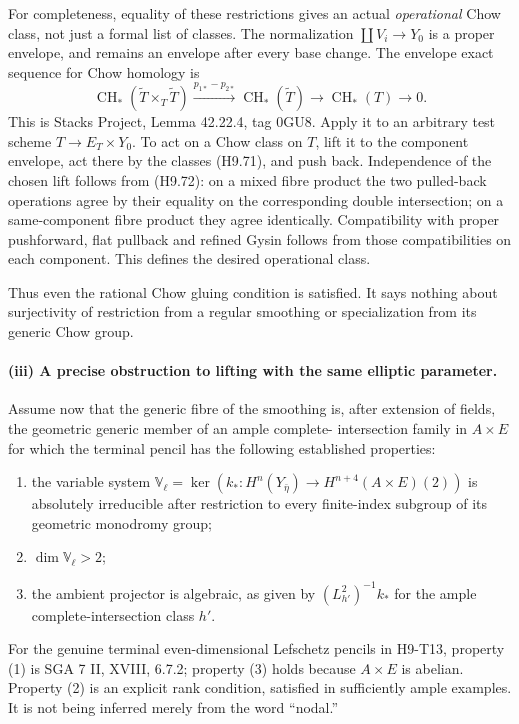 \documentclass[11pt,a4paper]{article}
\begin{document}
For completeness, equality of these restrictions gives an actual
\emph{operational} Chow class, not just a formal list of classes.
The normalization $\coprod V_i\to Y_0$ is a proper envelope, and
remains an envelope after every base change. The envelope exact
sequence for Chow homology is
\[
 \operatorname{CH}_*(\widetilde T\times_T\widetilde T)
 \xrightarrow{p_{1*}-p_{2*}}\operatorname{CH}_*(\widetilde T)
 \longrightarrow\operatorname{CH}_*(T)\longrightarrow0.
                                                               \tag{H9.72}
\]
This is Stacks Project, Lemma 42.22.4, tag 0GU8. Apply it to an
arbitrary test scheme $T\to E_T\times Y_0$. To act on a Chow
class on $T$, lift it to the component envelope, act there by the
classes (H9.71), and push back. Independence of the chosen lift
follows from (H9.72): on a mixed fibre product the two pulled-back
operations agree by their equality on the corresponding double
intersection; on a same-component fibre product they agree
identically. Compatibility with proper pushforward, flat pullback
and refined Gysin follows from those compatibilities on each
component. This defines the desired operational class.

Thus even the rational Chow gluing condition is satisfied. It says
nothing about surjectivity of restriction from a regular smoothing
or specialization from its generic Chow group.

\paragraph{(iii) A precise obstruction to lifting with the same elliptic parameter.}
Assume now that the generic fibre of the smoothing is, after extension
of fields, the geometric generic member of an ample complete-
intersection family in $A\times E$ for which the terminal pencil
has the following established properties:
\begin{enumerate}
\item the variable system
$\mathbb V_\ell=\ker(k_*:H^n(Y_{\bar\eta})
       \to H^{n+4}(A\times E)(2))$
is absolutely irreducible after restriction to every finite-index
subgroup of its geometric monodromy group;
\item $\dim\mathbb V_\ell>2$;
\item the ambient projector is algebraic, as given by
$(L_{h'}^2)^{-1}k_*$ for the ample complete-intersection class $h'$.
\end{enumerate}
For the genuine terminal even-dimensional Lefschetz pencils in
H9-T13, property (1) is SGA 7 II, XVIII, 6.7.2; property (3) holds
because $A\times E$ is abelian. Property (2) is an explicit rank
condition, satisfied in sufficiently ample examples. It is not
being inferred merely from the word ``nodal.''
\end{document}

